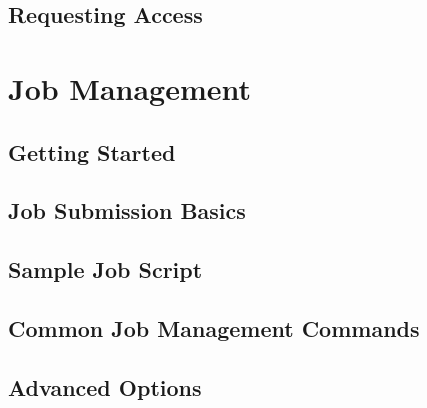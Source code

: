 \documentclass{easychair}
\begin{document}
\subsection{Requesting Access}
\label{sect:access-requests}


\section{Job Management}
\label{sect:job-management}


\subsection{Getting Started}
\label{sect:getting-started}


\subsection{Job Submission Basics}
\label{sect:job-submission-basics}


\subsection{Sample Job Script}
\label{sect:sample-job-script}


\subsection{Common Job Management Commands}
\label{sect:job-management-commands}


\subsection{Advanced  Options}
\label{sect:advanced-sbatch-options}

\end{document}
